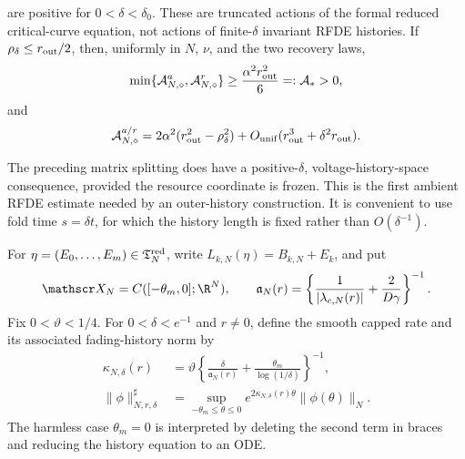 \begin{corollary}
are positive for \(0<\delta<\delta_0\).  These are truncated actions of the
formal reduced critical-curve equation, not actions of finite-\(\delta\)
invariant RFDE histories.  If \(\rho_\delta\le r_{\rm out}/2\), then, uniformly in
\(N\), \(\nu\), and the two recovery laws,
\begin{equation}
 \min\{\mathcal A^a_{N,\diamond},
        \mathcal A^r_{N,\diamond}\}
 \ge \frac{\alpha^2r_{\rm out}^2}{6}=:\mathcal A_*>0,
                                                               \label{eq:outer-action-lower-bound}
\end{equation}
and
\begin{equation}
 \mathcal A^{a/r}_{N,\diamond}
 =2\alpha^2(r_{\rm out}^2-\rho_\delta^2)
   +O_{\rm unif}(r_{\rm out}^3+\delta^2r_{\rm out}). \label{eq:outer-action-expansion}
\end{equation}
\end{corollary}

The preceding matrix splitting does have a positive-\(\delta\),
voltage-history-space consequence, provided the resource coordinate is frozen.
This is the first ambient RFDE estimate needed by an outer-history
construction.  It is convenient to use fold time \(s=\delta t\), for which
the history length is fixed rather than \(O(\delta^{-1})\).

For
\(\eta=(E_0,\ldots,E_m)\in\mathfrak T_N^{\rm red}\), write
\(L_{k,N}(\eta)=B_{k,N}+E_k\), and put
\begin{equation}
 \mathscr X_N=C([-\theta_m,0];\R^N),\qquad
 \mathfrak a_N(r)=
 \left\{\frac1{|\lambda_{c,N}(r)|}
             +\frac2{D\gamma}\right\}^{-1}.         \label{eq:frozen-history-a}
\end{equation}
Fix \(0<\vartheta<1/4\).  For \(0<\delta<e^{-1}\) and \(r\ne0\), define
the smooth capped rate and its associated fading-history norm by
\begin{align}
 \kappa_{N,\delta}(r)
 &=\vartheta\left\{
       \frac{\delta}{\mathfrak a_N(r)}
       +\frac{\theta_m}{\log(1/\delta)}\right\}^{-1},
                                                        \label{eq:frozen-history-rate}\\
 \|\phi\|_{N,r,\delta}^{\sharp}
 &=\sup_{-\theta_m\le\theta\le0}
       e^{2\kappa_{N,\delta}(r)\theta}\|\phi(\theta)\|_N.
                                                        \label{eq:frozen-history-norm}
\end{align}
The harmless case \(\theta_m=0\) is interpreted by deleting the second
term in braces and reducing the history equation to an ODE.


